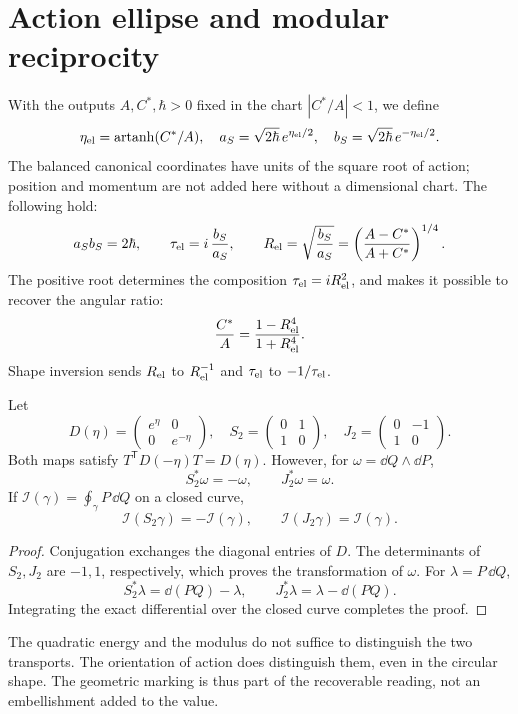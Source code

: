 \section{Action ellipse and modular reciprocity}
\label{sec:ellipse}
With the outputs $A,C^*,\hbar>0$ fixed in the chart
$|C^*/A|<1$, we define
\[
\eta_{\rm el}=\operatorname{artanh}(C^*/A),\quad
a_S=\sqrt{2\hbar}\,e^{\eta_{\rm el}/2},\quad
b_S=\sqrt{2\hbar}\,e^{-\eta_{\rm el}/2}.
\]
The balanced canonical coordinates have units of the square root of action;
position and momentum are not added here without a dimensional chart.
The following hold:
\[
a_Sb_S=2\hbar,\qquad
\tau_{\rm el}=i\,\frac{b_S}{a_S},\qquad
R_{\rm el}=\sqrt{\frac{b_S}{a_S}}
=\left(\frac{A-C^*}{A+C^*}\right)^{1/4}.
\]
The positive root determines the composition $\tau_{\rm el}=iR_{\rm el}^2$,
and makes it possible to recover the angular ratio:
\[
\frac{C^*}{A}=\frac{1-R_{\rm el}^4}{1+R_{\rm el}^4}.
\]
Shape inversion sends $R_{\rm el}$ to $R_{\rm el}^{-1}$ and
$\tau_{\rm el}$ to $-1/\tau_{\rm el}$.

\begin{proposition}
Let
\[
D(\eta)=\begin{pmatrix}e^\eta&0\\0&e^{-\eta}\end{pmatrix},
\quad
S_2=\begin{pmatrix}0&1\\1&0\end{pmatrix},
\quad
J_2=\begin{pmatrix}0&-1\\1&0\end{pmatrix}.
\]
Both maps satisfy $T^{\mathsf T}D(-\eta)T=D(\eta)$.
However, for $\omega=\dd Q\wedge\dd P$,
\[
S_2^*\omega=-\omega,\qquad J_2^*\omega=\omega.
\]
If $\mathcal I(\gamma)=\oint_\gamma P\,\dd Q$ on a closed curve,
\[
\mathcal I(S_2\gamma)=-\mathcal I(\gamma),\qquad
\mathcal I(J_2\gamma)=\mathcal I(\gamma).
\]
\end{proposition}
\begin{proof}
Conjugation exchanges the diagonal entries of $D$.
The determinants of $S_2,J_2$ are $-1,1$, respectively, which
proves the transformation of $\omega$. For $\lambda=P\,\dd Q$,
\[
S_2^*\lambda=\dd(PQ)-\lambda,\qquad
J_2^*\lambda=\lambda-\dd(PQ).
\]
Integrating the exact differential over the closed curve completes the proof.
\end{proof}

The quadratic energy and the modulus do not suffice to distinguish the two
transports. The orientation of action does distinguish them, even
in the circular shape. The geometric marking is thus part of the recoverable
reading, not an embellishment added to the value.
